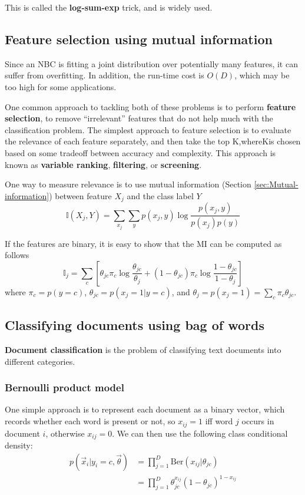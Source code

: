 \begin{refsection}
This is called the \textbf{log-sum-exp} trick, and is widely used. 


\subsection{Feature selection using mutual information}
Since an NBC is fitting a joint distribution over potentially many features, it can suffer from overfitting. In addition, the run-time cost is $O(D)$, which may be too high for some applications. 

One common approach to tackling both of these problems is to perform \textbf{feature selection}, to remove “irrelevant” features that do not help much with the classification problem. The simplest approach to feature selection is to evaluate the relevance of each feature separately, and then take the top K,whereKis chosen based on some tradeoff between accuracy and complexity. This approach is known as \textbf{variable ranking}, \textbf{filtering}, or \textbf{screening}.

One way to measure relevance is to use mutual information (Section \ref{sec:Mutual-information}) between feature $X_j$ and the class label $Y$
\begin{equation}
\mathbb{I}(X_j,Y)=\sum\limits_{x_j}{\sum\limits_{y}{p(x_j,y)\log \dfrac{p(x_j,y)}{p(x_j)p(y)}}}
\end{equation}

If the features are binary, it is easy to show that the MI can be computed as follows
\begin{equation}
\mathbb{I}_j = \sum\limits_c \left[\theta_{jc}\pi_c\log{\dfrac{\theta_{jc}}{\theta_j}}+(1-\theta_{jc})\pi_c\log{\dfrac{1-\theta_{jc}}{1-\theta_j}}\right]
\end{equation}
where $\pi_c=p(y=c)$, $\theta_{jc}=p(x_j=1|y=c)$, and $\theta_j=p(x_j=1)=\sum_{c} \pi_c\theta_{jc}$.


\subsection{Classifying documents using bag of words}
\textbf{Document classification} is the problem of classifying text documents into different categories.


\subsubsection{Bernoulli product model}
One simple approach is to represent each document as a binary vector, which records whether each word is present or not, so $x_{ij} =1$ iff word $j$ occurs in document $i$, otherwise $x_{ij}=0$. We can then use the following class conditional density:
\begin{equation}\begin{split}
p(\vec{x}_i|y_i=c,\vec{\theta}) & =\prod\limits_{j=1}^D \mathrm{Ber}(x_{ij}|\theta_{jc}) \\
& =\prod\limits_{j=1}^D \theta_{jc}^{x_{ij}}(1-\theta_{jc})^{1-x_{ij}}
\end{split}\end{equation}


\end{refsection}
